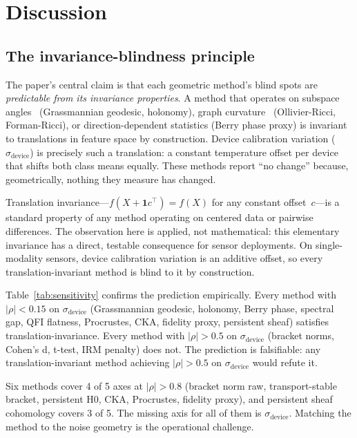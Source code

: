 \documentclass[11pt]{article}
\begin{document}
\section{Discussion}
\label{sec:discussion}

\subsection{The invariance-blindness principle}

The paper's central claim is that each geometric method's blind spots
are \emph{predictable from its invariance properties}.  A method that operates on subspace
angles~\citep{absil2008optimization,chikuse2003statistics} (Grassmannian geodesic, holonomy),
graph curvature~\citep{samal2018comparative} (Ollivier-Ricci,
Forman-Ricci), or direction-dependent statistics (Berry phase proxy) is
invariant to translations in feature space by construction.  Device calibration variation ($\sigma_\text{device}$)
is precisely such a translation: a constant temperature offset per
device that shifts both class means equally.  These methods report
``no change'' because, geometrically, nothing they measure has changed.

Translation invariance---$f(X + \mathbf{1}c^\top) = f(X)$ for any
constant offset~$c$---is a standard property of any method operating on
centered data or pairwise differences.  The observation here is applied,
not mathematical: this elementary invariance has a direct, testable
consequence for sensor deployments.  On single-modality sensors, device
calibration variation is an additive offset, so every
translation-invariant method is blind to it by construction.

Table~\ref{tab:sensitivity} confirms the prediction empirically.  Every
method with $|\rho| < 0.15$ on $\sigma_\text{device}$ (Grassmannian
geodesic, holonomy, Berry phase, spectral gap, QFI flatness, Procrustes,
CKA, fidelity proxy, persistent sheaf) satisfies
translation-invariance.  Every method with $|\rho| > 0.5$ on
$\sigma_\text{device}$ (bracket norms, Cohen's d, t-test, IRM
penalty) does not.  The prediction is falsifiable: any
translation-invariant method achieving $|\rho| > 0.5$ on
$\sigma_\text{device}$ would refute it.

Six methods cover 4 of 5 axes at $|\rho| > 0.8$ (bracket norm raw,
transport-stable bracket, persistent H0, CKA, Procrustes, fidelity
proxy), and persistent sheaf cohomology covers 3 of 5.  The missing
axis for all of them is $\sigma_\text{device}$.  Matching the method
to the noise geometry is the operational challenge.
\end{document}
